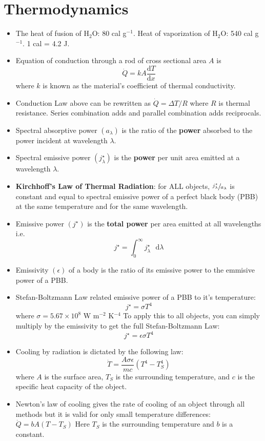 \documentclass{scrartcl}
\begin{document}
    \section{Thermodynamics}
    \begin{itemize}
        \item The heat of fusion of H$_2$O: 80 cal g$^{-1}$. Heat of vaporization of H$_2$O: 540 cal g$^{-1}$. 1 cal = 4.2 J.
        \item Equation of conduction through a rod of cross sectional area $A$ is \[\dot Q=kA\frac{\mathrm dT}{\mathrm dx}\] where $k$ is known as the material's coefficient of thermal conductivity.
        \item Conduction Law above can be rewritten as $\dot Q=\Delta T/R$ where $R$ is thermal resistance. Series combination adds and parallel combination adds reciprocals.
        \item Spectral absorptive power $\left(a_\lambda\right)$ is the ratio of the \textbf{power} absorbed to the power incident at wavelength $\lambda$.
        \item Spectral emissive power $\left(j^\star_\lambda\right)$  is the \textbf{power} per unit area emitted at a wavelength $\lambda$.
        \item \textbf{Kirchhoff's Law of Thermal Radiation}: for ALL objects, $\sfrac{j^\star_\lambda}{a_\lambda}$  is constant and equal to spectral emissive power of a perfect black body (PBB) at the same temperature and for the same wavelength.
        \item Emissive power $\left(j^\star\right)$ is the \textbf{total power} per area emitted at all wavelengths i.e. \[j^\star=\int_0^\infty j^\star_\lambda\text{ }\mathrm d\lambda\]
        \item Emissivity $\left(\epsilon\right)$ of a body is the ratio of its emissive power to the emmisive power of a PBB.
        \item Stefan-Boltzmann Law related emissive power of a PBB to it's temperature: \[j^\star=\sigma T^4\] where $\sigma=5.67\times10^8$ W m$^{-2}$ K$^{-4}$ To apply this to all objects, you can simply multiply by the emissivity to get the full Stefan-Boltzmann Law: \[j^\star=\epsilon\sigma T^4\]
        \item Cooling by radiation is dictated by the following law: \[\dot T=\frac{A\sigma \epsilon}{mc}\left(T^4-T_S^4\right)\] where $A$ is the surface area, $T_S$ is the surrounding temperature, and $c$ is the specific heat capacity of the object.
        \item Newton's law of cooling gives the rate of cooling of an object through all methods but it is valid for only small temperature differences: $\boxed{\dot Q=bA\left(T-T_S\right)}$ Here $T_S$ is the surrounding temperature and $b$ is a constant.

\end{itemize}
\end{document}
